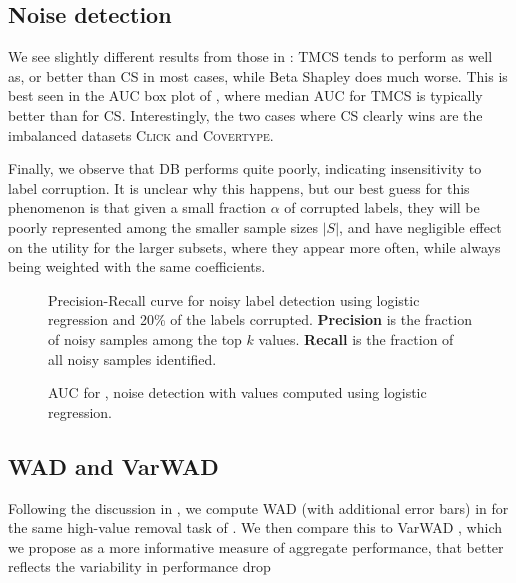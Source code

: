 \documentclass[10pt]{article}
\newcommand{\tmdfn}[1]{\textbf{#1}}
\newcommand{\tmname}[1]{\textsc{#1}}
\begin{document}
\subsection{Noise detection}\label{sec:noise-detection}

We see slightly different results from those in
{\cite{schoch_csshapley_2022}}: TMCS tends to perform as well as, or better
than CS in most cases, while Beta Shapley does much worse. This is best seen
in the AUC box plot of , where median AUC for TMCS is
typically better than for CS. Interestingly, the two cases where CS clearly
wins are the imbalanced datasets {\tmname{Click}} and {\tmname{Covertype}}.

Finally, we observe that DB performs quite poorly, indicating insensitivity to
label corruption. It is unclear why this happens, but our best guess for this
phenomenon is that given a small fraction $\alpha$ of corrupted labels, they
will be poorly represented among the smaller sample sizes $| S |$, and have
negligible effect on the utility for the larger subsets, where they appear
more often, while always being weighted with the same coefficients.

\begin{figure}[h]
  \caption{\label{fig:precision-recall-lr}Precision-Recall curve for noisy
  label detection using logistic regression and 20\% of the labels corrupted.
  {\tmdfn{Precision}} is the fraction of noisy samples among the top $k$
  values. {\tmdfn{Recall}} is the fraction of all noisy samples identified.}
\end{figure}

\begin{figure}[h]
  \caption{\label{fig:auc-lr}AUC for , noise
  detection with values computed using logistic regression.}
\end{figure}

\subsection{WAD and VarWAD}\label{sec:wad}

Following the discussion in , we compute WAD
(with additional error bars) in  for the same high-value
removal task of . We then compare this to VarWAD
, which we propose as a more informative measure of aggregate
performance, that better reflects the variability in performance drop
\end{document}
